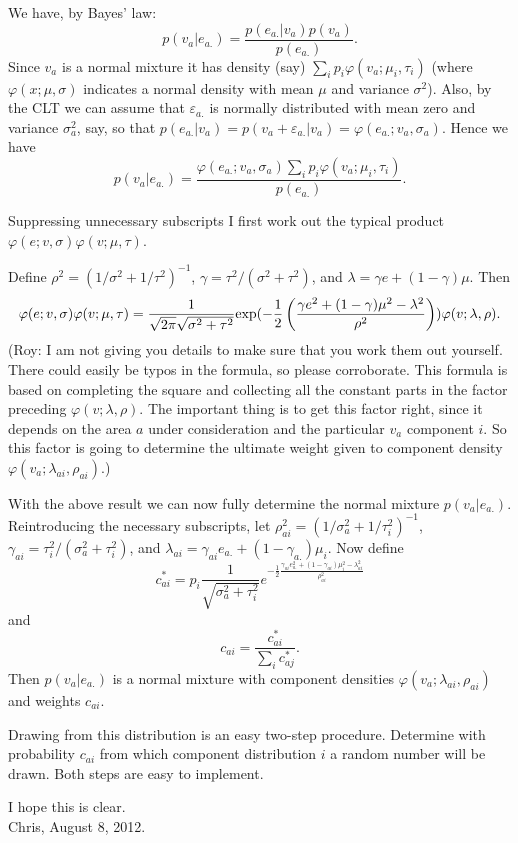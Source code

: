 \documentclass{article}
\begin{document}
\noindent We have, by Bayes' law:
\[
p(v_a | e_{a.}) = \frac{p(e_{a.} | v_a) p(v_a)}{p(e_{a.})}.
\]
Since $v_a$ is a normal mixture it has density (say) $ \sum_i p_i \varphi(v_a ; \mu_i, \tau_i)$ (where $\varphi(x; \mu, \sigma)$ indicates a normal density with mean $\mu$ and variance $\sigma^2$). Also, by the CLT we can assume that $\varepsilon_{a.}$ is normally distributed with mean zero and variance $\sigma^2_a$, say, so that $p(e_{a.} | v_a) = p(v_a+\varepsilon_{a.}|v_a) = \varphi(e_{a.}; v_a, \sigma_a)$. Hence we have
\[
p(v_a | e_{a.}) = \frac{\varphi(e_{a.} ; v_a, \sigma_a) \sum_i p_i \varphi(v_a; \mu_i, \tau_i)}{p(e_{a.})}.
\]

Suppressing unnecessary subscripts I first work out the typical product $\varphi(e ; v, \sigma) \varphi(v; \mu, \tau)$.

Define $\rho^2 = (1/\sigma^2 + 1/\tau^2)^{-1}$, $\gamma = \tau^2 / (\sigma^2+\tau^2)$, and $\lambda=\gamma e + (1-\gamma) \mu$. Then
\[
\varphi(e ; v, \sigma) \varphi(v; \mu, \tau) = 
\frac{1}{\sqrt{2\pi} \sqrt{\sigma^2+\tau^2}}{\rm exp}(-\frac{1}{2} \left(\frac{\gamma e^2 + (1-\gamma) \mu^2 - \lambda^2}{\rho^2} \right)) \varphi(v ; \lambda, \rho).
\]
(Roy: I am not giving you details to make sure that you work them out yourself. There could easily be typos in the formula, so please corroborate. This formula is based on completing the square and collecting all the constant parts in the factor preceding $\varphi(v; \lambda, \rho)$. The important thing is to get this factor right, since it depends on the area $a$ under consideration and the particular $v_a$ component $i$. So this factor is going to determine the ultimate weight given to component density $\varphi(v_a ; \lambda_{ai}, \rho_{ai}).$)

With the above result we can now fully determine the normal mixture $p(v_a | e_{a.})$.
Reintroducing the necessary subscripts, let
$\rho_{ai}^2 = (1/\sigma_a^2 + 1/\tau_i^2)^{-1}$, $\gamma_{ai} = \tau_i^2 / (\sigma_a^2+\tau_i^2)$, and $\lambda_{ai}=\gamma_{ai} e_{a.} + (1-\gamma_{a.}) \mu_i$. Now define
\[
c_{ai}^* = p_i  \frac{1}{\sqrt{\sigma_a^2+\tau_i^2}}e^{-\frac{1}{2} \frac{\gamma_{ai} e_{a.}^2 + (1-\gamma_{ai}) \mu_i^2 - \lambda_{ai}^2}{\rho_{ai}^2} }
\]
and
\[
c_{ai} = \frac{c_{ai}^*}{\sum_i c_{aj}^*}.
\]
Then $p(v_a | e_{a.})$ is a normal mixture with component densities $\varphi(v_a ; \lambda_{ai}, \rho_{ai})$ and weights $c_{ai}$.

Drawing from this distribution is an easy two-step procedure. Determine with probability $c_{ai}$ from which component distribution $i$ a random number will be drawn. Both steps are easy to implement.

I hope this is clear.\\[1cm]
\small Chris, August 8, 2012.
\end{document}
